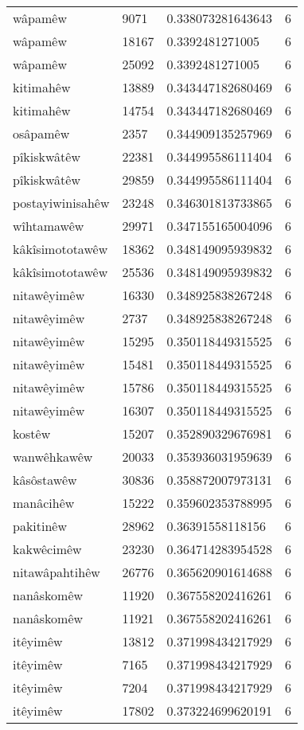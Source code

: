 \begin{longtable}{llll}
wâpamêw & 9071 & 0.338073281643643 & 6\\
wâpamêw & 18167 & 0.3392481271005 & 6\\
wâpamêw & 25092 & 0.3392481271005 & 6\\
kitimahêw & 13889 & 0.343447182680469 & 6\\
kitimahêw & 14754 & 0.343447182680469 & 6\\
osâpamêw & 2357 & 0.344909135257969 & 6\\
pîkiskwâtêw & 22381 & 0.344995586111404 & 6\\
pîkiskwâtêw & 29859 & 0.344995586111404 & 6\\
postayiwinisahêw & 23248 & 0.346301813733865 & 6\\
wîhtamawêw & 29971 & 0.347155165004096 & 6\\
kâkîsimototawêw & 18362 & 0.348149095939832 & 6\\
kâkîsimototawêw & 25536 & 0.348149095939832 & 6\\
nitawêyimêw & 16330 & 0.348925838267248 & 6\\
nitawêyimêw & 2737 & 0.348925838267248 & 6\\
nitawêyimêw & 15295 & 0.350118449315525 & 6\\
nitawêyimêw & 15481 & 0.350118449315525 & 6\\
nitawêyimêw & 15786 & 0.350118449315525 & 6\\
nitawêyimêw & 16307 & 0.350118449315525 & 6\\
kostêw & 15207 & 0.352890329676981 & 6\\
wanwêhkawêw & 20033 & 0.353936031959639 & 6\\
kâsôstawêw & 30836 & 0.358872007973131 & 6\\
manâcihêw & 15222 & 0.359602353788995 & 6\\
pakitinêw & 28962 & 0.36391558118156 & 6\\
kakwêcimêw & 23230 & 0.364714283954528 & 6\\
nitawâpahtihêw & 26776 & 0.365620901614688 & 6\\
nanâskomêw & 11920 & 0.367558202416261 & 6\\
nanâskomêw & 11921 & 0.367558202416261 & 6\\
itêyimêw & 13812 & 0.371998434217929 & 6\\
itêyimêw & 7165 & 0.371998434217929 & 6\\
itêyimêw & 7204 & 0.371998434217929 & 6\\
itêyimêw & 17802 & 0.373224699620191 & 6\\

\end{longtable}
